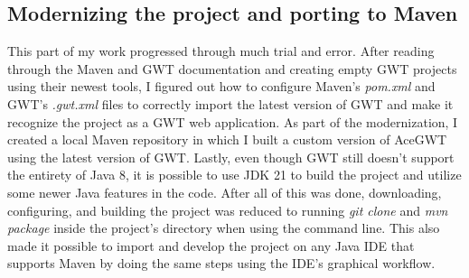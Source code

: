 \subsection*{Modernizing the project and porting to Maven}

This part of my work progressed through much trial and error. After reading through the Maven and GWT documentation and creating empty GWT projects using their newest tools, I figured out how to configure Maven's \emph{pom.xml} and GWT's \emph{.gwt.xml} files to correctly import the latest version of GWT and make it recognize the project as a GWT web application. As part of the modernization, I created a local Maven repository in which I built a custom version of AceGWT using the latest version of GWT. Lastly, even though GWT still doesn't support the entirety of Java 8, it is possible to use JDK 21 to build the project and utilize some newer Java features in the code.
\newline
After all of this was done, downloading, configuring, and building the project was reduced to running \emph{git clone} and \emph{mvn package} inside the project's directory when using the command line. This also made it possible to import and develop the project on any Java IDE that supports Maven by doing the same steps using the IDE's graphical workflow.
